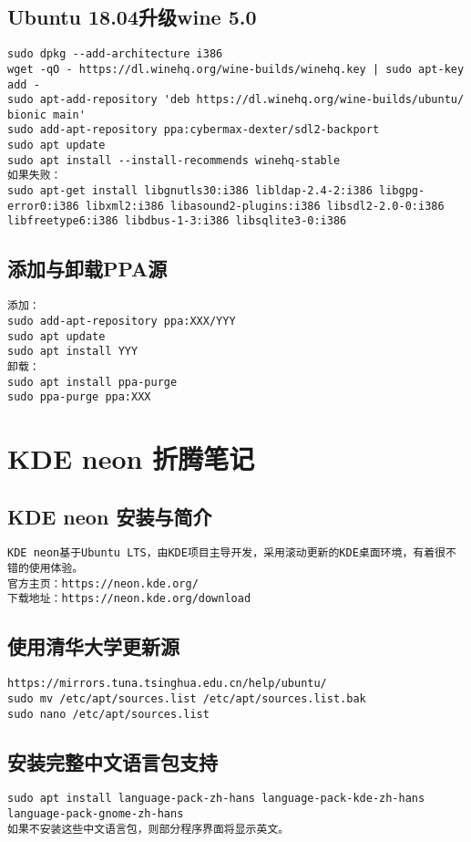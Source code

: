 \documentclass[a4paper,fontset=fandol,zihao=-4,linespread=1.2,oneside]{ctexbook}
\begin{document}
\section{Ubuntu 18.04升级wine 5.0}
\begin{lstlisting}
sudo dpkg --add-architecture i386
wget -qO - https://dl.winehq.org/wine-builds/winehq.key | sudo apt-key add -
sudo apt-add-repository 'deb https://dl.winehq.org/wine-builds/ubuntu/ bionic main'
sudo add-apt-repository ppa:cybermax-dexter/sdl2-backport
sudo apt update
sudo apt install --install-recommends winehq-stable
如果失败：
sudo apt-get install libgnutls30:i386 libldap-2.4-2:i386 libgpg-error0:i386 libxml2:i386 libasound2-plugins:i386 libsdl2-2.0-0:i386 libfreetype6:i386 libdbus-1-3:i386 libsqlite3-0:i386
\end{lstlisting}

\section{添加与卸载PPA源}
\begin{lstlisting}
添加：
sudo add-apt-repository ppa:XXX/YYY
sudo apt update
sudo apt install YYY
卸载：
sudo apt install ppa-purge
sudo ppa-purge ppa:XXX
\end{lstlisting}


\chapter{KDE neon 折腾笔记}

\section{KDE neon 安装与简介}
\begin{lstlisting}
KDE neon基于Ubuntu LTS，由KDE项目主导开发，采用滚动更新的KDE桌面环境，有着很不错的使用体验。
官方主页：https://neon.kde.org/
下载地址：https://neon.kde.org/download
\end{lstlisting}

\section{使用清华大学更新源}
\begin{lstlisting}
https://mirrors.tuna.tsinghua.edu.cn/help/ubuntu/
sudo mv /etc/apt/sources.list /etc/apt/sources.list.bak
sudo nano /etc/apt/sources.list
\end{lstlisting}

\section{安装完整中文语言包支持}
\begin{lstlisting}
sudo apt install language-pack-zh-hans language-pack-kde-zh-hans language-pack-gnome-zh-hans
如果不安装这些中文语言包，则部分程序界面将显示英文。
\end{lstlisting}
\end{document}
